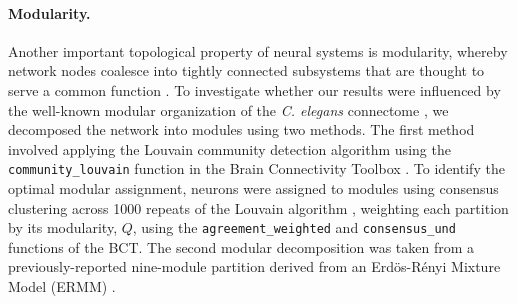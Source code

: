 \documentclass[10pt,letterpaper]{article}
\begin{document}
\paragraph{Modularity.}
\color{teal}
Another important topological property of neural systems is modularity, whereby network nodes coalesce into tightly connected subsystems that are thought to serve a common function \cite{Sporns2016}.
\color{black}
To investigate whether our results were influenced by the well-known modular organization of the \emph{C. elegans} connectome \cite{Kim:2014bu, Pan:2010jt, Bassett2010, Achacoso:1992ay, Pavlovic:2014gx}, we decomposed the network into modules using two methods.
The first method involved applying the Louvain community detection algorithm \cite{Blondel:2008do} using the \texttt{community\_louvain} function in the Brain Connectivity Toolbox \cite{Rubinov:2010jd}.
To identify the optimal modular assignment, neurons were assigned to modules using consensus clustering across 1000 repeats of the Louvain algorithm \cite{Lancichinetti2012}, weighting each partition by its modularity, $Q$, using the \texttt{agreement\_weighted} and \texttt{consensus\_und} functions of the BCT\cite{Rubinov:2010jd}.
The second modular decomposition was taken from a previously-reported nine-module partition derived from an Erd\"os-R\'enyi Mixture Model (ERMM) \cite{Pavlovic:2014gx}.


\end{document}
